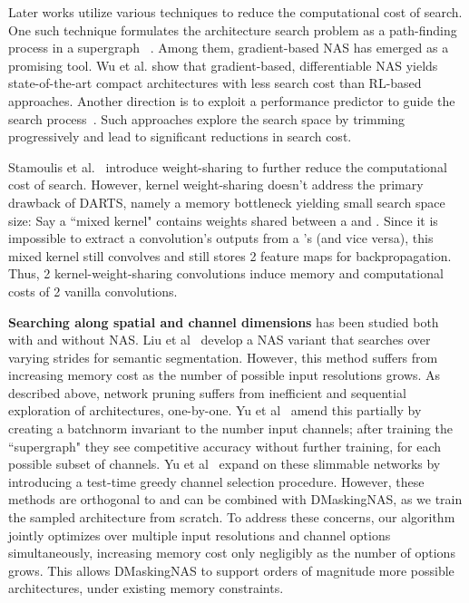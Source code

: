 \documentclass[10pt,twocolumn,letterpaper]{article}
\begin{document}
Later works utilize various techniques to reduce the computational cost of search. One such technique formulates the architecture search problem as a path-finding process in a supergraph ~\cite{fbnet, darts, one-shot, single_path}. Among them, gradient-based NAS has emerged as a promising tool. Wu et al. show that gradient-based, differentiable NAS yields state-of-the-art compact architectures with  less search cost than RL-based approaches. Another direction is to exploit a performance predictor to guide the search process~\cite{chamnet, progressive}. Such approaches explore the search space by trimming progressively and lead to significant reductions in search cost. 

Stamoulis et al.~\cite{singlepathnas} introduce weight-sharing to further reduce the computational cost of search. However, kernel weight-sharing doesn't address the primary drawback of DARTS, namely a memory bottleneck yielding small search space size: Say a ``mixed kernel" contains weights shared between a  and . Since it is impossible to extract a  convolution's outputs from a 's (and vice versa), this mixed kernel still convolves  and still stores 2 feature maps for backpropagation. Thus, 2 kernel-weight-sharing convolutions induce memory and computational costs of 2 vanilla convolutions.



\textbf{Searching along spatial and channel dimensions} has been studied both with and without NAS. Liu et al~\cite{autodeeplab} develop a NAS variant that searches over varying strides for semantic segmentation. However, this method suffers from increasing memory cost as the number of possible input resolutions grows. As described above, network pruning suffers from inefficient and sequential exploration of architectures, one-by-one. Yu et al~\cite{slimmable} amend this partially by creating a batchnorm invariant to the number input channels; after training the ``supergraph" they see competitive accuracy without further training, for each possible subset of channels. Yu et al~\cite{autoslim} expand on these slimmable networks by introducing a test-time greedy channel selection procedure. However, these methods are orthogonal to and can be combined with DMaskingNAS, as we train the sampled architecture from scratch. To address these concerns, our algorithm jointly optimizes over multiple input resolutions and channel options simultaneously, increasing memory cost only negligibly as the number of options grows. This allows DMaskingNAS to support orders of magnitude more possible architectures, under existing memory constraints.
\end{document}
